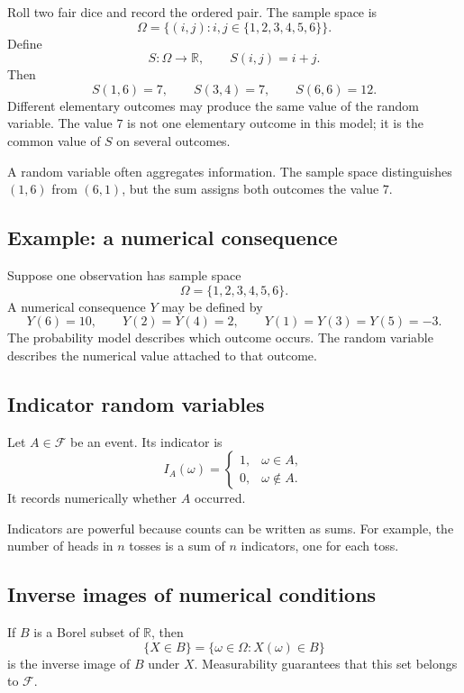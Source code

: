 Roll two fair dice and record the ordered pair. The sample space is
\[
\Omega=\{(i,j):i,j\in\{1,2,3,4,5,6\}\}.
\]
Define
\[
S:\Omega\to\mathbb R,
\qquad
S(i,j)=i+j.
\]
Then
\[
S(1,6)=7,
\qquad
S(3,4)=7,
\qquad
S(6,6)=12.
\]
Different elementary outcomes may produce the same value of the random variable.
The value \(7\) is not one elementary outcome in this model; it is the common
value of \(S\) on several outcomes.

\begin{remarkbox}
A random variable often aggregates information. The sample space distinguishes
\((1,6)\) from \((6,1)\), but the sum assigns both outcomes the value \(7\).
\end{remarkbox}

\subsection*{Example: a numerical consequence}

Suppose one observation has sample space
\[
\Omega=\{1,2,3,4,5,6\}.
\]
A numerical consequence \(Y\) may be defined by
\[
Y(6)=10,
\qquad
Y(2)=Y(4)=2,
\qquad
Y(1)=Y(3)=Y(5)=-3.
\]
The probability model describes which outcome occurs. The random variable
describes the numerical value attached to that outcome.

\subsection*{Indicator random variables}

Let \(A\in\mathcal F\) be an event. Its indicator is
\[
I_A(\omega)=
\begin{cases}
1, & \omega\in A,\\
0, & \omega\notin A.
\end{cases}
\]
It records numerically whether \(A\) occurred.

Indicators are powerful because counts can be written as sums. For example, the
number of heads in \(n\) tosses is a sum of \(n\) indicators, one for each toss.

\subsection*{Inverse images of numerical conditions}

If \(B\) is a Borel subset of \(\mathbb R\), then
\[
\{X\in B\}
=
\{\omega\in\Omega:X(\omega)\in B\}
\]
is the inverse image of \(B\) under \(X\). Measurability guarantees that this set
belongs to \(\mathcal F\).

